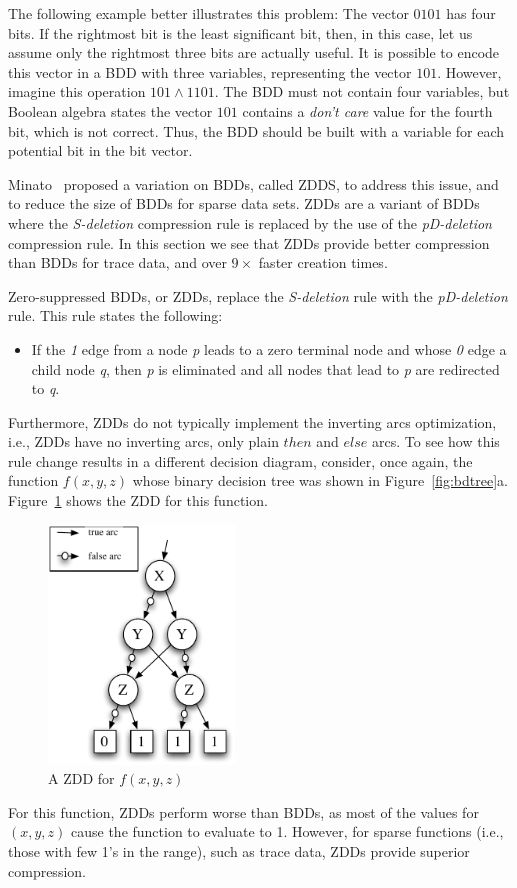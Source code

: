 \documentclass[defaultstyle,11pt]{thesis}
\begin{document}
The following example better illustrates this problem: The vector
${0101}$ has four bits.  If the rightmost bit is the least significant
bit, then, in this case, let us assume only the rightmost three bits
are actually useful.  It is possible to encode this vector in a BDD
with three variables, representing the vector ${101}$.  However,
imagine this operation ${101} \wedge {1101}$. The BDD must not contain
four variables, but Boolean algebra states the vector ${101}$
contains a \textit{don't care} value for the fourth bit, which is not
correct.  Thus, the BDD should be built with a variable for each
potential bit in the bit vector.

Minato~\cite{minato:93:dac} proposed a variation on BDDs, called ZDDS,
to address this issue, and to reduce the size of BDDs for sparse data
sets.  ZDDs are a variant of BDDs where the \textit{S-deletion}
compression rule is replaced by the use of the \emph{pD-deletion}
compression rule.  In this section we see that ZDDs provide better
compression than BDDs for trace data, and over $9\times$ faster
creation times.

Zero-suppressed BDDs, or ZDDs, replace the \textit{S-deletion} rule with
the \textit{pD-deletion} rule.  This rule states the following:
\begin{itemize}

\item If the \textit{1} edge from a node \textit{p} leads to a zero
  terminal node and whose \textit{0} edge a child node \textit {q}, then
  \textit{p} is eliminated and all nodes that lead to \textit{p} are
  redirected to \textit{q}.

\end{itemize}

Furthermore, ZDDs do not typically implement the inverting arcs
optimization, i.e., ZDDs have no inverting arcs, only plain $then$ and
$else$ arcs.  To see how this rule change results in a different
decision diagram, consider, once again, the function $f(x,y,z)$ whose
binary decision tree was shown in Figure~\ref{fig:bdtree}a.
Figure~\ref{fig:rozdd} shows the ZDD for this function.
\begin{figure}
  \centering
  \includegraphics[height=2.5in]{figures/rozdd}
  \caption{A ZDD for $f(x,y,z)$}
  \label{fig:rozdd}
\end{figure}
For this function, ZDDs perform worse than BDDs, as most of the values
for $(x,y,z)$ cause the function to evaluate to 1.  However, for
sparse functions (i.e., those with few 1's in the range), such as
trace data, ZDDs provide superior compression.
\end{document}
